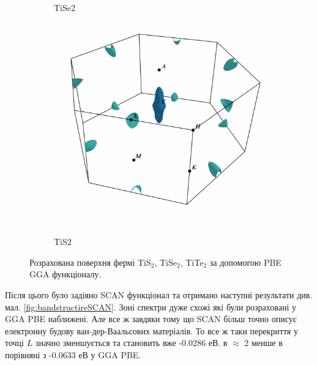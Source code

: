 \begin{figure}[H]
\begin{subfigure}[b]{.4\textwidth}
    	\caption{
    	TiSe2}
	\end{subfigure}
	\begin{subfigure}[b]{.9\textwidth}
    	\includegraphics[width=\linewidth]{img/results/fstis2.pdf}
    	\caption{
    	TiS2}
	\end{subfigure}
\caption{Розрахована поверхня фермі TiS$_2$, TiSe$_2$, TiTe$_2$ за допомогою PBE GGA функціоналу.}
\label{fig:fermisurf}
\end{figure}

Після цього було задіяно SCAN функціонал та отримано наступні результати див. мал. \ref{fig:bandstructireSCAN}. Зоні спектри дуже схожі які були розраховані у GGA PBE наближені. Але все ж завдяки тому що SCAN більш точно описує електронну будову ван-дер-Ваальсових матеріалів. То все ж таки перекриття у точці $L$ значно зменшується та становить вже -0.0286 еВ. в $\approx$ 2 менше в порівняні з -0.0633 еВ у GGA PBE. 

